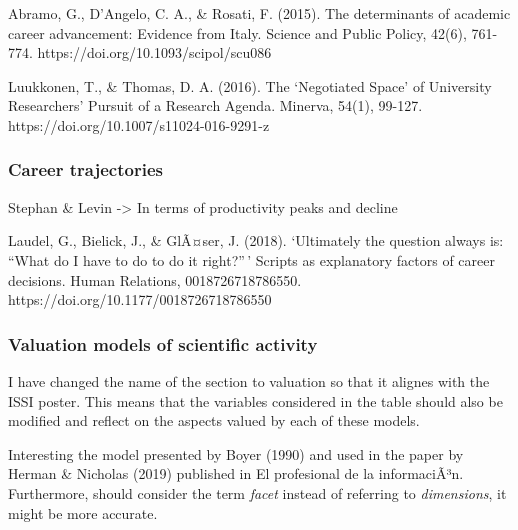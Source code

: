 \documentclass[]{elsarticle} %
\begin{document}
Abramo, G., D'Angelo, C. A., \& Rosati, F. (2015). The determinants of
academic career advancement: Evidence from Italy. Science and Public
Policy, 42(6), 761-774. https://doi.org/10.1093/scipol/scu086

Luukkonen, T., \& Thomas, D. A. (2016). The `Negotiated Space' of
University Researchers' Pursuit of a Research Agenda. Minerva, 54(1),
99-127. https://doi.org/10.1007/s11024-016-9291-z

\hypertarget{career-trajectories}{%
\subsubsection{Career trajectories}\label{career-trajectories}}

Stephan \& Levin -\textgreater{} In terms of productivity peaks and
decline

Laudel, G., Bielick, J., \& GlÃ¤ser, J. (2018). `Ultimately the question
always is: ``What do I have to do to do it right?''\,' Scripts as
explanatory factors of career decisions. Human Relations,
0018726718786550. https://doi.org/10.1177/0018726718786550

\hypertarget{valuation-models-of-scientific-activity}{%
\subsubsection{Valuation models of scientific
activity}\label{valuation-models-of-scientific-activity}}

I have changed the name of the section to valuation so that it alignes
with the ISSI poster. This means that the variables considered in the
table should also be modified and reflect on the aspects valued by each
of these models.

Interesting the model presented by Boyer (1990) and used in the paper by
Herman \& Nicholas (2019) published in El profesional de la
informaciÃ³n. Furthermore, should consider the term \emph{facet} instead
of referring to \emph{dimensions}, it might be more accurate.
\end{document}
